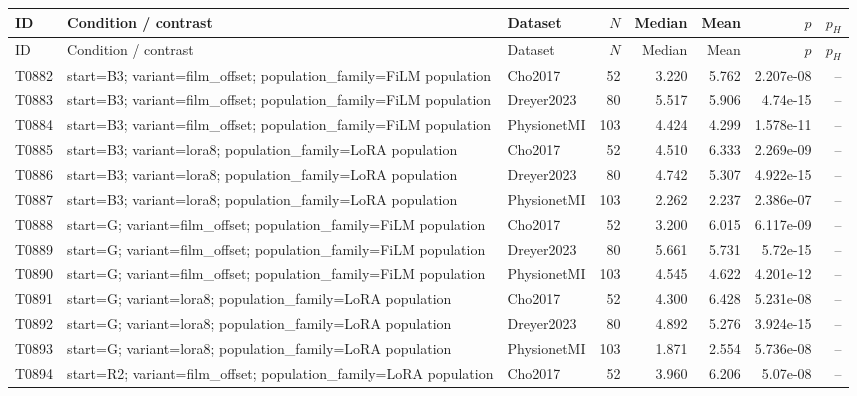 \begin{longtable}{p{.45in}p{2.6in}p{.75in}rrrrr}
\toprule
ID & Condition / contrast & Dataset & $N$ & Median & Mean & $p$ & $p_H$ \\
\midrule
\endfirsthead
\toprule
ID & Condition / contrast & Dataset & $N$ & Median & Mean & $p$ & $p_H$ \\
\midrule
\endhead
T0882 & start=B3; variant=film\_\allowbreak{}offset; population\_\allowbreak{}family=FiLM population & Cho2017 & 52 & 3.220 & 5.762 & 2.207e-08 & -- \\
T0883 & start=B3; variant=film\_\allowbreak{}offset; population\_\allowbreak{}family=FiLM population & Dreyer2023 & 80 & 5.517 & 5.906 & 4.74e-15 & -- \\
T0884 & start=B3; variant=film\_\allowbreak{}offset; population\_\allowbreak{}family=FiLM population & PhysionetMI & 103 & 4.424 & 4.299 & 1.578e-11 & -- \\
T0885 & start=B3; variant=lora8; population\_\allowbreak{}family=LoRA population & Cho2017 & 52 & 4.510 & 6.333 & 2.269e-09 & -- \\
T0886 & start=B3; variant=lora8; population\_\allowbreak{}family=LoRA population & Dreyer2023 & 80 & 4.742 & 5.307 & 4.922e-15 & -- \\
T0887 & start=B3; variant=lora8; population\_\allowbreak{}family=LoRA population & PhysionetMI & 103 & 2.262 & 2.237 & 2.386e-07 & -- \\
T0888 & start=G; variant=film\_\allowbreak{}offset; population\_\allowbreak{}family=FiLM population & Cho2017 & 52 & 3.200 & 6.015 & 6.117e-09 & -- \\
T0889 & start=G; variant=film\_\allowbreak{}offset; population\_\allowbreak{}family=FiLM population & Dreyer2023 & 80 & 5.661 & 5.731 & 5.72e-15 & -- \\
T0890 & start=G; variant=film\_\allowbreak{}offset; population\_\allowbreak{}family=FiLM population & PhysionetMI & 103 & 4.545 & 4.622 & 4.201e-12 & -- \\
T0891 & start=G; variant=lora8; population\_\allowbreak{}family=LoRA population & Cho2017 & 52 & 4.300 & 6.428 & 5.231e-08 & -- \\
T0892 & start=G; variant=lora8; population\_\allowbreak{}family=LoRA population & Dreyer2023 & 80 & 4.892 & 5.276 & 3.924e-15 & -- \\
T0893 & start=G; variant=lora8; population\_\allowbreak{}family=LoRA population & PhysionetMI & 103 & 1.871 & 2.554 & 5.736e-08 & -- \\
T0894 & start=R2; variant=film\_\allowbreak{}offset; population\_\allowbreak{}family=LoRA population & Cho2017 & 52 & 3.960 & 6.206 & 5.07e-08 & -- \\

\end{longtable}
